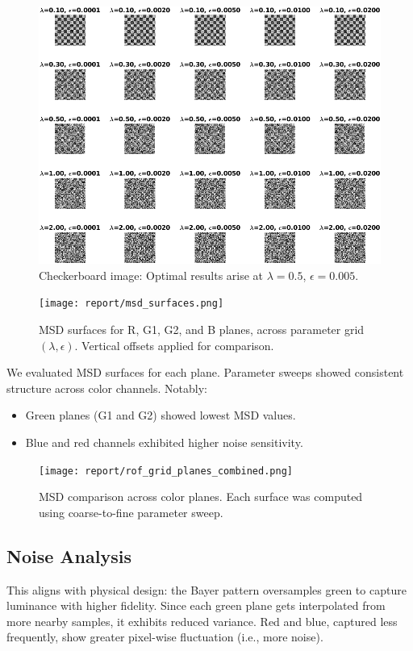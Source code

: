 \documentclass[11pt]{article}
\begin{document}
\begin{figure}[h!]
\centering
\includegraphics[width=\textwidth]{../utils/results/test_grid_5x5/checkerboard_grid.png}
\caption{Checkerboard image: Optimal results arise at \(\lambda=0.5\), \(\epsilon=0.005\).}
\end{figure}



\begin{figure}[h!]
    \centering
    \texttt{[image: report/msd\_surfaces.png]}
    \caption{MSD surfaces for R, G1, G2, and B planes, across parameter grid $(\lambda, \epsilon)$. Vertical offsets applied for comparison.}
\end{figure}
We evaluated MSD surfaces for each plane. Parameter sweeps showed consistent structure across color channels. Notably:

\begin{itemize}
  \item Green planes (G1 and G2) showed lowest MSD values.
  \item Blue and red channels exhibited higher noise sensitivity.
\end{itemize}

\begin{figure}[h!]
\centering
\texttt{[image: report/rof\_grid\_planes\_combined.png]}
\caption{MSD comparison across color planes. Each surface was computed using coarse-to-fine parameter sweep.}
\end{figure}

\subsection*{Noise Analysis}
This aligns with physical design: the Bayer pattern oversamples green to capture luminance with higher fidelity. Since each green plane gets interpolated from more nearby samples, it exhibits reduced variance. Red and blue, captured less frequently, show greater pixel-wise fluctuation (i.e., more noise).
\end{document}
